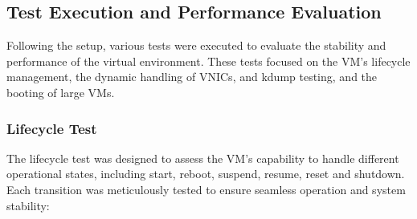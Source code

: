 \subsection{Test Execution and Performance Evaluation}
Following the setup, various tests were executed to evaluate the stability and performance of the virtual environment. These tests focused on the VM's lifecycle management, the dynamic handling of VNICs, and kdump testing, and the booting of large VMs.

\subsubsection[Lifecycle Test]{Lifecycle Test}

The lifecycle test was designed to assess the VM’s capability to handle different operational states, including start, reboot, suspend, resume, reset and shutdown. Each transition was meticulously tested to ensure seamless operation and system stability:

